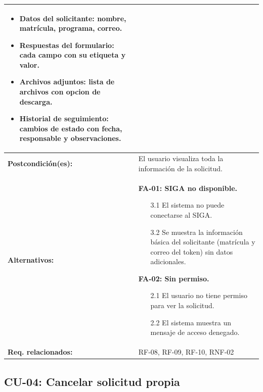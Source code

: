 \begin{longtable}{|L{4cm}|L{9.5cm}|}
\begin{enumerate}[nosep, leftmargin=*]
\begin{itemize}[nosep]
                \item Datos del solicitante: nombre, matrícula, programa, correo.
                \item Respuestas del formulario: cada campo con su etiqueta y valor.
                \item Archivos adjuntos: lista de archivos con opcion de descarga.
                \item Historial de seguimiento: cambios de estado con fecha, responsable y observaciones.
            \end{itemize}
    \end{enumerate} \\
    \hline
    \textbf{Postcondición(es):} & El usuario visualiza toda la información de la solicitud. \\
    \hline
    \textbf{Alternativos:} &
    \textbf{FA-01: SIGA no disponible.}
    \begin{enumerate}[nosep, leftmargin=*]
        \item[3.1] El sistema no puede conectarse al SIGA.
        \item[3.2] Se muestra la información básica del solicitante (matrícula y correo del token) sin datos adicionales.
    \end{enumerate}
    \vspace{0.2cm}
    \textbf{FA-02: Sin permiso.}
    \begin{enumerate}[nosep, leftmargin=*]
        \item[2.1] El usuario no tiene permiso para ver la solicitud.
        \item[2.2] El sistema muestra un mensaje de acceso denegado.
    \end{enumerate} \\
    \hline
    \textbf{Req. relacionados:} & RF-08, RF-09, RF-10, RNF-02 \\
    \hline
\end{longtable}

\subsection{CU-04: Cancelar solicitud propia}

